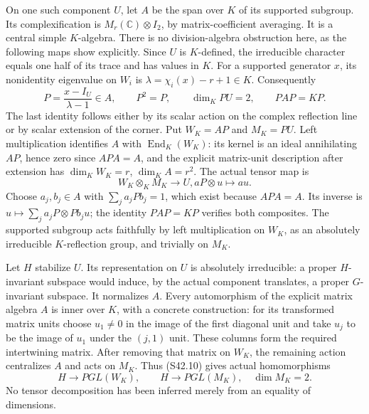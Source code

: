 On one such component \(U\), let \(A\) be the span over
\(K\) of its supported subgroup. Its complexification is
\(M_r(\mathbb C)\otimes I_2\), by matrix-coefficient
averaging. It is a central simple \(K\)-algebra. There is
no division-algebra obstruction here, as the following maps
show explicitly. Since \(U\) is \(K\)-defined, the
irreducible character equals one half of its trace and has
values in \(K\). For a supported generator \(x\), its
nonidentity eigenvalue on \(W_i\) is
\(\lambda=\chi_i(x)-r+1\in K\). Consequently
\[
          P=\frac{x-I_U}{\lambda-1}\in A,\qquad
          P^2=P,\qquad\dim_K PU=2,\qquad PAP=KP.           \tag{S42.9}
\]
The last identity follows either by its scalar action on the
complex reflection line or by scalar extension of the corner.
Put \(W_K=AP\) and \(M_K=PU\). Left multiplication
identifies \(A\) with \(\operatorname{End}_K(W_K)\):
its kernel is an ideal annihilating \(AP\), hence zero
since \(APA=A\), and the explicit matrix-unit description
after extension has \(\dim_K W_K=r\), \(\dim_K A=r^2\).
The actual tensor map is
\[
 W_K\otimes_K M_K\longrightarrow U,
                    aP\otimes u\longmapsto au.              \tag{S42.10}
\]
Choose \(a_j,b_j\in A\) with \(\sum_j a_jPb_j=1\),
which exist because \(APA=A\). Its inverse is
\(u\mapsto\sum_j a_jP\otimes Pb_j u\); the identity
\(PAP=KP\) verifies both composites. The supported
subgroup acts faithfully by left multiplication on \(W_K\),
as an absolutely irreducible \(K\)-reflection group, and
trivially on \(M_K\).

Let \(H\) stabilize \(U\). Its representation on \(U\)
is absolutely irreducible: a proper \(H\)-invariant subspace
would induce, by the actual component translates, a proper
\(G\)-invariant subspace. It normalizes \(A\). Every
automorphism of the explicit matrix algebra \(A\) is inner
over \(K\), with a concrete construction: for its transformed
matrix units choose \(u_1\ne0\) in the image of the first
diagonal unit and take \(u_j\) to be the image of \(u_1\)
under the \((j,1)\) unit. These columns form the required
intertwining matrix. After removing that matrix on \(W_K\),
the remaining action centralizes \(A\) and acts on \(M_K\).
Thus (S42.10) gives actual homomorphisms
\[
                 H\longrightarrow PGL(W_K),\qquad
                 H\longrightarrow PGL(M_K),\quad\dim M_K=2.
                                                               \tag{S42.11}
\]
No tensor decomposition has been inferred merely from an
equality of dimensions.


